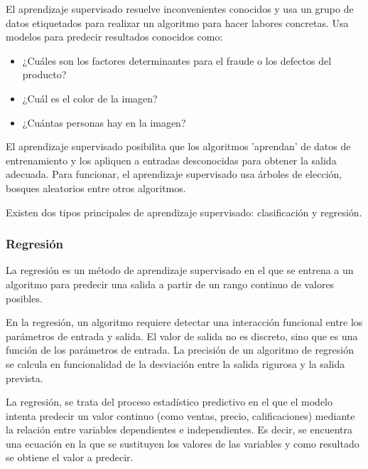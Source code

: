 El aprendizaje supervisado resuelve inconvenientes conocidos y usa un grupo de datos etiquetados para realizar un algoritmo para hacer labores concretas. Usa modelos para predecir resultados conocidos como:
\begin{itemize}
    \item ¿Cuáles son los factores determinantes para el fraude o los defectos del producto?
    \item ¿Cuál es el color de la imagen?
    \item ¿Cuántas personas hay en la imagen?
\end{itemize}
 El aprendizaje supervisado posibilita que los algoritmos 'aprendan' de datos de entrenamiento y los apliquen a entradas desconocidas para obtener la salida adecuada. Para funcionar, el aprendizaje supervisado usa árboles de elección, bosques aleatorios entre otros algoritmos.\par
 
 Existen dos tipos principales de aprendizaje supervisado: clasificación y regresión.\par
 
 \subsubsection{Regresión}\par
 La regresión es un método de aprendizaje supervisado en el que se entrena a un algoritmo para predecir una salida a partir de un rango continuo de valores posibles.\par 
 
 En la regresión, un algoritmo requiere detectar una interacción funcional  entre los parámetros de entrada y salida. El valor de salida no es discreto, sino que es una función de los parámetros de entrada. La precisión de un algoritmo de regresión se calcula en funcionalidad de la desviación entre la salida rigurosa y la salida prevista.\par
 
 La regresión, se trata del proceso estadístico predictivo en el que el modelo intenta predecir un valor continuo (como ventas, precio, calificaciones) mediante la relación entre variables dependientes e independientes. Es decir, se encuentra una ecuación en la que se sustituyen los valores de las variables y como resultado se obtiene el valor a predecir.\par
 
